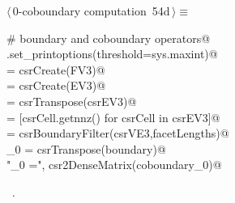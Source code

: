 \documentclass[11pt,oneside]{article}	%
\begin{document}
\begin{flushleft} \small \label{scrap94}
\protect{}$\langle\,$0-coboundary computation\nobreak\ {\footnotesize 54d}$\,\rangle\equiv$
\vspace{-1ex}
\begin{list}{}{} \item
\mbox{}\verb@# boundary and coboundary operators@\\
\mbox{}\verb@np.set_printoptions(threshold=sys.maxint)@\\
\mbox{} = csrCreate(FV3)@\\
\mbox{} = csrCreate(EV3)@\\
\mbox{} = csrTranspose(csrEV3)@\\
\mbox{}\verb@facetLengths = [csrCell.getnnz() for csrCell in csrEV3]@\\
\mbox{}\verb@boundary = csrBoundaryFilter(csrVE3,facetLengths)@\\
\mbox{}\verb@coboundary_0 = csrTranspose(boundary)@\\
\mbox{}\verb@print "\ncoboundary_0 =\n", csr2DenseMatrix(coboundary_0)@\\
\mbox{}\verb@@{\NWsep}
\end{list}
\vspace{-1ex}
\footnotesize\addtolength{\baselineskip}{-1ex}
\begin{list}{}{\setlength{\itemsep}{-\parsep}\setlength{\itemindent}{-\leftmargin}}
\item \NWtxtMacroRefIn\ .
\end{list}
\end{flushleft}
\end{document}
